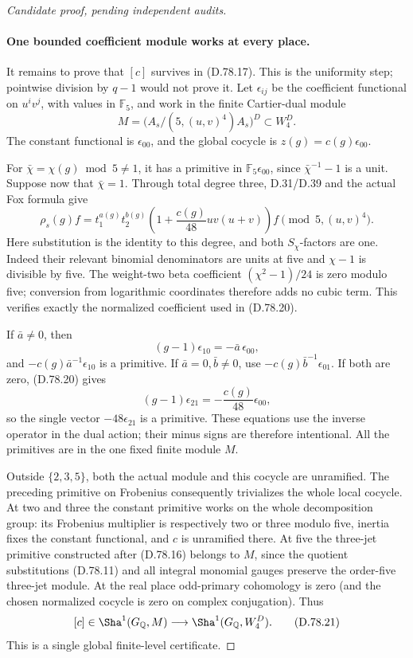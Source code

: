 \begin{proof}[Candidate proof, pending independent audits]
\paragraph{One bounded coefficient module works at every place.}
It remains to prove that \([c]\) survives in (D.78.17).
This is the uniformity step; pointwise division by \(q-1\)
would not prove it.
Let \(\epsilon_{ij}\) be the coefficient functional on
\(u^iv^j\), with values in \(\mathbb F_5\), and work in
the finite Cartier-dual module
\[
 M=\bigl(A_s/(5,(u,v)^4)A_s\bigr)^D
                  \subset W_4^D.
                                                               \tag{D.78.19}
\]
The constant functional is \(\epsilon_{00}\), and the
global cocycle is \(z(g)=c(g)\epsilon_{00}\).

For \(\bar\chi=\chi(g)\bmod5\ne1\), it has a primitive in
\(\mathbb F_5\epsilon_{00}\), since \(\bar\chi^{-1}-1\)
is a unit. Suppose now that \(\bar\chi=1\).
Through total degree three, D.31/D.39 and the actual
Fox formula give
\[
 \rho_s(g)f=
 t_1^{a(g)}t_2^{b(g)}
 \left(1+\frac{c(g)}{48}uv(u+v)\right)f
       \pmod{5,(u,v)^4}.                                \tag{D.78.20}
\]
Here substitution is the identity to this degree, and
both \(S_\chi\)-factors are one. Indeed their relevant
binomial denominators are units at five and
\(\chi-1\) is divisible by five. The weight-two beta
coefficient \((\chi^2-1)/24\) is zero modulo five;
conversion from logarithmic coordinates therefore
adds no cubic term. This verifies exactly the normalized
coefficient used in (D.78.20).

If \(\bar a\ne0\), then
\[
           (g-1)\epsilon_{10}=-\bar a\,\epsilon_{00},
 \]
and \(-c(g)\bar a^{-1}\epsilon_{10}\) is a primitive.
If \(\bar a=0,\bar b\ne0\), use
\(-c(g)\bar b^{-1}\epsilon_{01}\).
If both are zero, (D.78.20) gives
\[
           (g-1)\epsilon_{21}
                         =-\frac{c(g)}{48}\epsilon_{00},
 \]
so the single vector \(-48\epsilon_{21}\) is a primitive.
These equations use the inverse operator in the dual
action; their minus signs are therefore intentional.
All the primitives are in the one fixed finite module \(M\).

Outside \(\{2,3,5\}\), both the actual module and this
cocycle are unramified. The preceding primitive on
Frobenius consequently trivializes the whole local
cocycle. At two and three the constant primitive works
on the whole decomposition group: its Frobenius
multiplier is respectively two or three modulo five,
inertia fixes the constant functional, and \(c\) is
unramified there. At five the three-jet primitive
constructed after (D.78.16) belongs to \(M\), since
the quotient substitutions (D.78.11) and all integral
monomial gauges preserve the order-five three-jet
module. At the real place odd-primary cohomology is
zero (and the chosen normalized cocycle is zero on
complex conjugation). Thus
\[
                 [c]\in\Sha^1(G_{\mathbb Q},M)
                           \longrightarrow\Sha^1(G_{\mathbb Q},W_4^D).
                                                               \tag{D.78.21}
\]
This is a single global finite-level certificate.


\end{proof}
